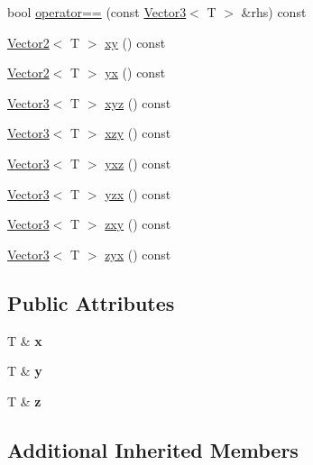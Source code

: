 \begin{DoxyCompactItemize}
\item 
bool \mbox{\hyperlink{class_vector3_a4206accf1c00e63b0181a56a32ba3c01}{operator==}} (const \mbox{\hyperlink{class_vector3}{Vector3}}$<$ T $>$ \&rhs) const
\item 
\mbox{\hyperlink{class_vector2}{Vector2}}$<$ T $>$ \mbox{\hyperlink{class_vector3_ae129388b328e1989ae6fe671fb0f73eb}{xy}} () const
\item 
\mbox{\hyperlink{class_vector2}{Vector2}}$<$ T $>$ \mbox{\hyperlink{class_vector3_a136e95915dd535fd5dafec54814bd460}{yx}} () const
\item 
\mbox{\hyperlink{class_vector3}{Vector3}}$<$ T $>$ \mbox{\hyperlink{class_vector3_a19844da39de7a26862856c7d12a009ca}{xyz}} () const
\item 
\mbox{\hyperlink{class_vector3}{Vector3}}$<$ T $>$ \mbox{\hyperlink{class_vector3_a890a30bec732a65aaae386eb21d393df}{xzy}} () const
\item 
\mbox{\hyperlink{class_vector3}{Vector3}}$<$ T $>$ \mbox{\hyperlink{class_vector3_ab026847d50c092c8ccf5c5314edca3db}{yxz}} () const
\item 
\mbox{\hyperlink{class_vector3}{Vector3}}$<$ T $>$ \mbox{\hyperlink{class_vector3_a678d9ca488ba19d592965d0094bd685f}{yzx}} () const
\item 
\mbox{\hyperlink{class_vector3}{Vector3}}$<$ T $>$ \mbox{\hyperlink{class_vector3_a325fdcf29fb440716dcb22583822e3b4}{zxy}} () const
\item 
\mbox{\hyperlink{class_vector3}{Vector3}}$<$ T $>$ \mbox{\hyperlink{class_vector3_a43ee17c0dffc0290b18db9464c802be9}{zyx}} () const
\end{DoxyCompactItemize}
\subsection*{Public Attributes}
\begin{DoxyCompactItemize}
\item 
\mbox{\label{class_vector3_a38e47f8a9493825839805762e2e52a9f}} 
T \& {\bfseries x}
\item 
\mbox{\label{class_vector3_aea025aed76d4f17ee9b38b8a4a934bc6}} 
T \& {\bfseries y}
\item 
\mbox{\label{class_vector3_a74b5b2db480db093d05f6a3651b8f588}} 
T \& {\bfseries z}
\end{DoxyCompactItemize}
\subsection*{Additional Inherited Members}


